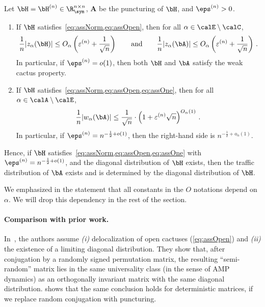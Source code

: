 \begin{theorem}[Universality]
    \label{thm:universality-new}
    Let $\bH = \bH^{(n)}\in\R^{n\times n}_\sym$, $\bm A$ be the puncturing
    of $\bH$, and $\eps^{(n)} > 0$.
    \begin{enumerate}
        \item If $\bH$ satisfies~\cref{eq:assNorm,eq:assOpen}, then for all $\alpha\in \calE\setminus \calC$, 
        \[
            \frac 1n |z_\alpha(\bH)|\le O_\alpha\left( \varepsilon^{(n)} + \frac 1 {\sqrt n}\right)\qquad\text{and}\qquad\frac 1n |z_\alpha(\bA)|\le O_\alpha\left( \varepsilon^{(n)} + \frac 1 {\sqrt n}\right)\,.
        \]
        In particular, if $\eps^{(n)}=o(1)$, then
        both $\bH$ and $\bA$ satisfy the weak cactus property.
        \item If $\bH$ satisfies~\cref{eq:assNorm,eq:assOpen,eq:assOne}, then for all $\alpha\in \calA\setminus \calE$, 
        \[
            \frac 1n |w_\alpha(\bA)|\le \frac 1 {\sqrt n}\cdot \left(1 + \varepsilon^{(n)} \sqrt n\right)^{O_\alpha(1)}\,.
        \]
        In particular, if $\eps^{(n)} = n^{-\frac 12 + o(1)}$, then the right-hand side is $n^{-\frac 12 + o_\alpha(1)}$.
    \end{enumerate}
    Hence, if $\bH$ satisfies~\cref{eq:assNorm,eq:assOpen,eq:assOne} with $\eps^{(n)} = n^{-\frac 12 + o(1)}$, and the diagonal distribution of $\bH$ exists, then the traffic distribution of $\bA$ exists
    and is determined by the diagonal distribution of $\bH$.
\end{theorem}

\noindent We emphasized in the statement 
that all constants in the $O$
notations depend on $\alpha$.
We will drop this dependency in the rest
of the section.

\paragraph{Comparison with prior work.}
    In~\cite[Theorem 2.8]{wang2022universality}, the authors assume {\em (i)} delocalization of open cactuses
    (\cref{eq:assOpen}) and {\em (ii)} the existence of a limiting diagonal
    distribution. They show that, after conjugation by a randomly signed
    permutation matrix, the resulting ``semi-random'' matrix lies in the same
    universality class (in the sense of AMP dynamics) as an orthogonally
    invariant matrix with the same diagonal distribution.
     shows that the same conclusion holds for
    deterministic matrices, if we replace random conjugation with puncturing.

